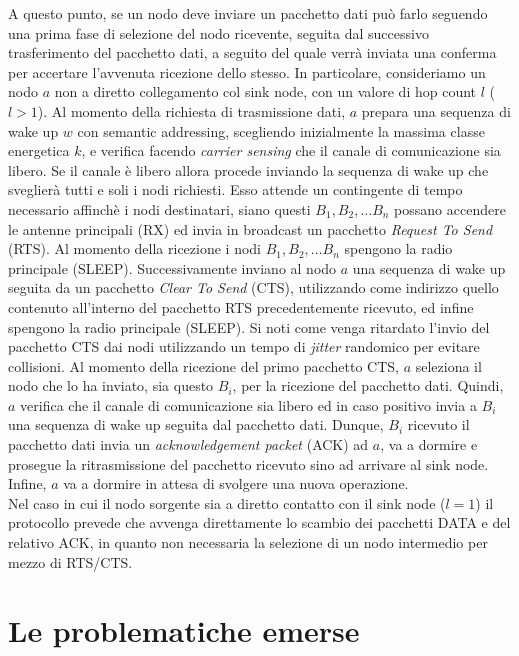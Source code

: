 \documentclass{report}
\begin{document}
A questo punto, se un nodo deve inviare un pacchetto dati può farlo seguendo una prima fase di selezione del nodo ricevente, seguita dal
successivo trasferimento del pacchetto dati, a seguito del quale verrà inviata una conferma per accertare l'avvenuta ricezione dello stesso. In particolare,
consideriamo un nodo $a$ non a diretto collegamento col sink node, con un valore di hop count $l$ ($l>1$). Al momento della richiesta di trasmissione dati,
$a$ prepara una sequenza di wake up $w$ con semantic addressing, scegliendo inizialmente la massima classe energetica $k$, e verifica facendo
\emph{carrier sensing} che il canale di comunicazione sia libero. Se il canale è libero allora procede inviando la sequenza di wake up che sveglierà tutti
e soli i nodi richiesti. Esso attende un contingente di tempo necessario affinchè i nodi destinatari, siano questi $B_1, B_2, \ldots B_n$ 
possano accendere le antenne principali (RX) ed invia in broadcast un pacchetto \emph{Request To Send} (RTS). Al momento della ricezione 
i nodi $B_1, B_2, \ldots B_n$ spengono la radio principale (SLEEP). Successivamente inviano al nodo $a$ una sequenza di wake up seguita da un pacchetto
\emph{Clear To Send} (CTS), utilizzando come indirizzo quello contenuto all'interno del pacchetto RTS precedentemente ricevuto, ed infine spengono
la radio principale (SLEEP). Si noti come venga ritardato l'invio del pacchetto CTS dai nodi utilizzando un tempo di \emph{jitter} randomico
per evitare collisioni. Al momento della ricezione del primo pacchetto CTS, $a$ seleziona il nodo che lo ha inviato, sia questo $B_i$,
per la ricezione del pacchetto dati. Quindi, $a$ verifica che il canale di comunicazione sia libero ed in caso positivo invia a $B_i$ una sequenza di wake up
seguita dal pacchetto dati. Dunque, $B_i$ ricevuto il pacchetto dati invia un \emph{acknowledgement packet} (ACK) ad $a$, va a dormire e prosegue la
ritrasmissione del pacchetto ricevuto sino ad arrivare al sink node. Infine, $a$ va a dormire in attesa di svolgere una nuova operazione.\\

Nel caso in cui il nodo sorgente sia a diretto contatto con il sink node ($l=1$) il protocollo prevede che avvenga direttamente lo scambio dei
pacchetti DATA e del relativo ACK, in quanto non necessaria la selezione di un nodo intermedio per mezzo di RTS/CTS.

\section{Le problematiche emerse}
\end{document}
